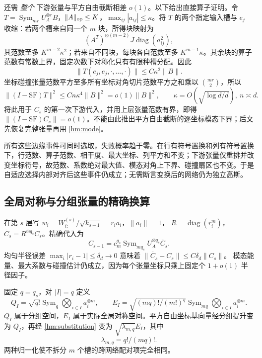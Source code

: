 \documentclass[a4paper]{tufte-handout}
\begin{document}
\begin{fullwidth}
还需 \emph{整个} 下游张量与平方自由截断相差 $o(1)$。以下给出直接算子证明。令 $T=\operatorname{Sym}_{mr}U_A^{\otimes r}B$，$\|A\|_{\rm op}\le K$，$\max_{ij}|a_{ij}|\le\kappa$。将 $T$ 的两个指定输入槽与 $e_j$ 收缩：若两个槽来自同一个 $m$ 块，所得块映射为
\[
 (A^T)^{\otimes(m-2)}J\operatorname{diag}(a_{ij}^2),
\]
其范数至多 $K^{m-2}\kappa^2$；若来自不同块，每块各自范数至多 $K^{m-1}\kappa$。其余块的算子范数有常数上界，固定次数下对称化只有有限种槽分配。因此
\[
 \|T(e_j,e_j,\cdot,\ldots,\cdot)\|\le C\kappa^2\|B\|.
\]
坐标碰撞张量范数平方至多所有坐标对角切片范数平方之和乘以 $\binom{mr}{2}$，所以
\begin{equation}\label{hm:collision}
 \|(I-\mathrm{SF})T\|^2\le C n\kappa^4\|B\|^2=o(1)\|B\|^2,
 \qquad \kappa=O(\sqrt{\log d/d}),\ n\asymp d.
\end{equation}
将此用于 $C_s$ 的第一次下游代入，并用上层张量范数有界，即得
$\|(I-\mathrm{SF})C_s\|=o(1)$。不能由此推出平方自由截断的逐坐标模态下界；后文先恢复完整张量再用 \eqref{hm:mode}。

所有这些边缘事件可同时选取，失败概率趋于零。在行有符号置换和列有符号置换下，行范数、算子范数、相干度、最大坐标、列平方和不变；下游张量仅重排并改变坐标符号，故范数、系数绝对最大值、模态对角上下界、碰撞扇区也不变。于是自适应选择内部对齐后这些事件仍成立；无需断言变换后的网络仍为独立高斯。

\subsection{全局对称与分组张量的精确换算}
在第 $s$ 层写 $w_i=W^{(s)}_{i:}/\sqrt{k_{s-1}}=r_i a_i$，$\|a_i\|=1$，
$R=\operatorname{diag}(r_i^m)$，$\overline C_s=R^{\otimes q_s}C_s$。精确代入为
\begin{equation}\label{hm:substitution}
 C_{s-1}=c_m^{q_s}\operatorname{Sym}_{mq_s}U_A^{\otimes q_s}\overline C_s.
\end{equation}
均匀半径误差 $\max_i|r_i-1|\le\delta_d\to0$ 意味着
$\|\overline C_s-C_s\|\le C\delta_d\|C_s\|$。
模态能量、最大系数与碰撞估计仍成立，因为每个张量坐标只乘上固定个 $1+o(1)$ 半径因子。

固定 $q=q_s$，对 $|I|=q$ 定义
\[
 Q_I=\sqrt{q!}\operatorname{Sym}_q\bigotimes_{i\in I}a_i^{\otimes m},\qquad
 E_I=\sqrt{(mq)!/(m!)^q}\operatorname{Sym}_{mq}\bigotimes_{i\in I}a_i^{\otimes m}.
\]
$Q_I$ 属于分组空间，$E_I$ 属于实际全局对称空间。平方自由坐标基向量经分组提升变为 $Q_I$，再经 \eqref{hm:substitution} 变为 $\sqrt{\lambda_{m,q}}E_I$，其中
\begin{equation}\label{hm:lambda}
 \lambda_{m,q}=q!/(mq)!.
\end{equation}
两种归一化使不拆分 $m$ 个槽的跨网络配对项完全相同。


\end{fullwidth}
\end{document}
